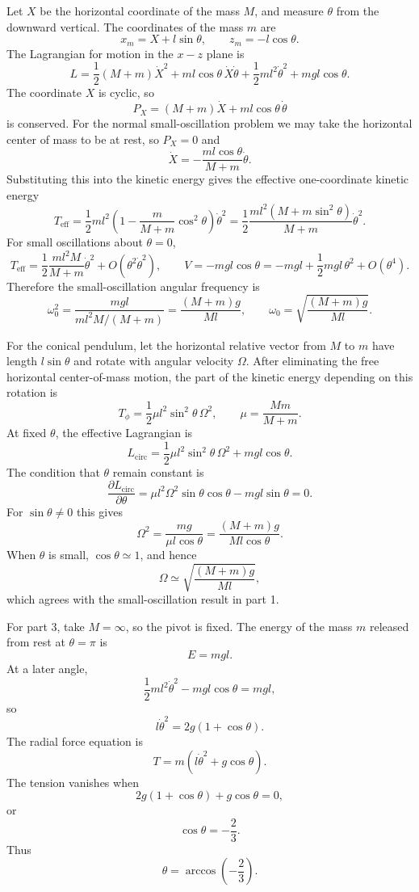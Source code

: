 \begin{solution}
Let $X$ be the horizontal coordinate of the mass $M$, and measure $\theta$ from the downward vertical. The coordinates of the mass $m$ are
\[
    x_m=X+l\sin\theta,\qquad z_m=-l\cos\theta .
\]
The Lagrangian for motion in the $x-z$ plane is
\[
    L=\frac{1}{2}(M+m)\dot X^2+ml\cos\theta\,\dot X\dot\theta
      +\frac{1}{2}ml^2\dot\theta^2+mgl\cos\theta .
\]
The coordinate $X$ is cyclic, so
\[
    P_X=(M+m)\dot X+ml\cos\theta\,\dot\theta
\]
is conserved. For the normal small-oscillation problem we may take the horizontal center of mass to be at rest, so $P_X=0$ and
\[
    \dot X=-\frac{ml\cos\theta}{M+m}\dot\theta .
\]
Substituting this into the kinetic energy gives the effective one-coordinate kinetic energy
\[
    T_{\mathrm{eff}}
    =\frac{1}{2}ml^2\left(1-\frac{m}{M+m}\cos^2\theta\right)\dot\theta^2
    =\frac{1}{2}\frac{ml^2(M+m\sin^2\theta)}{M+m}\dot\theta^2 .
\]
For small oscillations about $\theta=0$,
\[
    T_{\mathrm{eff}}=\frac{1}{2}\frac{ml^2M}{M+m}\dot\theta^2+O(\theta^2\dot\theta^2),
    \qquad
    V=-mgl\cos\theta=-mgl+\frac{1}{2}mgl\,\theta^2+O(\theta^4).
\]
Therefore the small-oscillation angular frequency is
\[
    \omega_0^2=\frac{mgl}{ml^2M/(M+m)}
    =\frac{(M+m)g}{Ml},
    \qquad
    \omega_0=\sqrt{\frac{(M+m)g}{Ml}} .
\]

For the conical pendulum, let the horizontal relative vector from $M$ to $m$ have length $l\sin\theta$ and rotate with angular velocity $\Omega$. After eliminating the free horizontal center-of-mass motion, the part of the kinetic energy depending on this rotation is
\[
    T_{\phi}=\frac{1}{2}\mu l^2\sin^2\theta\,\Omega^2,
    \qquad
    \mu=\frac{Mm}{M+m}.
\]
At fixed $\theta$, the effective Lagrangian is
\[
    L_{\mathrm{circ}}=\frac{1}{2}\mu l^2\sin^2\theta\,\Omega^2+mgl\cos\theta .
\]
The condition that $\theta$ remain constant is
\[
    \frac{\partial L_{\mathrm{circ}}}{\partial\theta}
    =\mu l^2\Omega^2\sin\theta\cos\theta-mgl\sin\theta=0 .
\]
For $\sin\theta\neq 0$ this gives
\[
    \Omega^2=\frac{mg}{\mu l\cos\theta}
    =\frac{(M+m)g}{Ml\cos\theta}.
\]
When $\theta$ is small, $\cos\theta\simeq 1$, and hence
\[
    \Omega\simeq \sqrt{\frac{(M+m)g}{Ml}},
\]
which agrees with the small-oscillation result in part 1.

For part 3, take $M=\infty$, so the pivot is fixed. The energy of the mass $m$ released from rest at $\theta=\pi$ is
\[
    E=mgl.
\]
At a later angle,
\[
    \frac{1}{2}ml^2\dot\theta^2-mgl\cos\theta=mgl,
\]
so
\[
    l\dot\theta^2=2g(1+\cos\theta).
\]
The radial force equation is
\[
    T=m(l\dot\theta^2+g\cos\theta).
\]
The tension vanishes when
\[
    2g(1+\cos\theta)+g\cos\theta=0,
\]
or
\[
    \cos\theta=-\frac{2}{3}.
\]
Thus
\[
    \theta=\arccos\left(-\frac{2}{3}\right).
\]


\end{solution}
